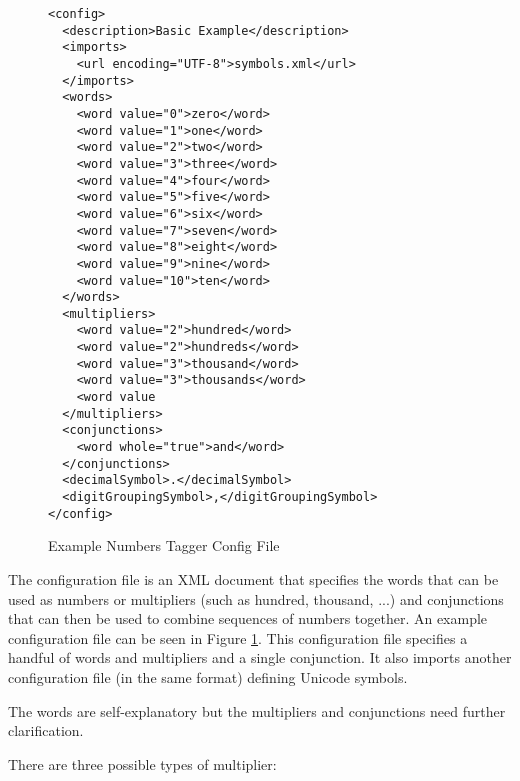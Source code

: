 \begin{figure}
\centering
\begin{small}
\begin{verbatim}
<config>
  <description>Basic Example</description>
  <imports>
    <url encoding="UTF-8">symbols.xml</url>
  </imports>
  <words>
    <word value="0">zero</word>
    <word value="1">one</word>
    <word value="2">two</word>
    <word value="3">three</word>
    <word value="4">four</word>
    <word value="5">five</word>
    <word value="6">six</word>
    <word value="7">seven</word>
    <word value="8">eight</word>
    <word value="9">nine</word>
    <word value="10">ten</word>
  </words>
  <multipliers>
    <word value="2">hundred</word>
    <word value="2">hundreds</word>
    <word value="3">thousand</word>
    <word value="3">thousands</word>
    <word value
  </multipliers>
  <conjunctions>
    <word whole="true">and</word>
  </conjunctions>
  <decimalSymbol>.</decimalSymbol>
  <digitGroupingSymbol>,</digitGroupingSymbol>
</config>
\end{verbatim}
\end{small}
\caption{Example Numbers Tagger Config File}
\label{fig:numbers:example}
\end{figure}

The configuration file is an XML document that specifies the words that can be
used as numbers or multipliers (such as hundred, thousand, ...) and conjunctions
that can then be used to combine sequences of numbers together. An example
configuration file can be seen in Figure \ref{fig:numbers:example}. This
configuration file specifies a handful of words and multipliers and a single
conjunction. It also imports another configuration file (in the same format)
defining Unicode symbols.

The words are self-explanatory but the multipliers and conjunctions need further
clarification.

There are three possible types of multiplier:

